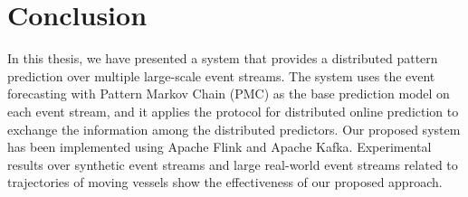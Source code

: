 \section{Conclusion}

\par In this thesis, we have presented a system that provides a distributed pattern prediction over multiple large-scale event streams. The system uses the event forecasting with Pattern Markov Chain (PMC) \cite{alevizos2017event} as the base prediction model on each event stream, and it applies the protocol for distributed online prediction \cite{kamp2014communication} to exchange the information among the distributed predictors.  Our proposed system has been implemented using Apache Flink and Apache Kafka. Experimental results over synthetic event streams and large real-world event streams related to trajectories of moving vessels show the effectiveness of our proposed approach.